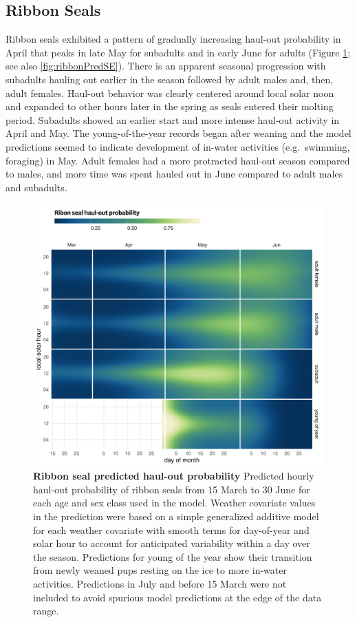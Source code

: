 \documentclass[fleqn,10pt,lineno]{wlpeerj} %
\begin{document}
\hypertarget{ribbon-seals}{%
\subsection*{Ribbon Seals}\label{ribbon-seals}}

Ribbon seals exhibited a pattern of gradually increasing haul-out probability in
April that peaks in late May for subadults and in early June for adults (Figure
\ref{fig:ribbonHOCal}; see also \ref{fig:ribbonPredSE}). There is an apparent
seasonal progression with subadults hauling out earlier in the season followed
by adult males and, then, adult females. Haul-out behavior was clearly centered
around local solar noon and expanded to other hours later in the spring as seals
entered their molting period. Subadults showed an earlier start and more intense
haul-out activity in April and May. The young-of-the-year records began after
weaning and the model predictions seemed to indicate development of in-water
activities (e.g.~swimming, foraging) in May. Adult females had a more protracted
haul-out season compared to males, and more time was spent hauled out in June
compared to adult males and subadults.



\begin{figure}
\includegraphics[width=1\linewidth]{../figures/ribbonHOCal-1} \caption{\textbf{Ribbon seal predicted haul-out probability} \linebreak Predicted hourly haul-out probability of ribbon seals from 15 March to 30 June for each age and sex class used in the model. Weather covariate values in the prediction were based on a simple generalized additive model for each weather covariate with smooth terms for day-of-year and solar hour to account for anticipated variability within a day over the season. Predictions for young of the year show their transition from newly weaned pups resting on the ice to more in-water activities. Predictions in July and before 15 March were not included to avoid spurious model predictions at the edge of the data range.}\label{fig:ribbonHOCal}
\end{figure}
\end{document}
